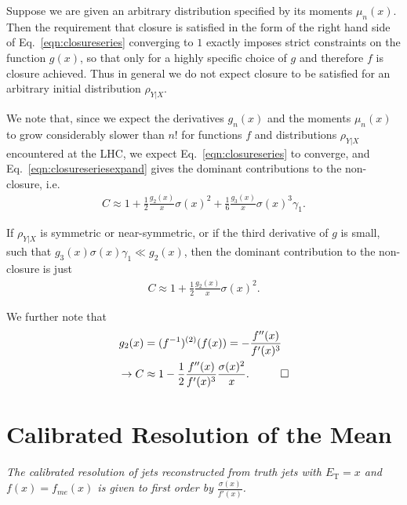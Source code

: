 Suppose we are given an arbitrary distribution specified by its moments $\mu_n(x)$. Then the requirement that closure is satisfied in the form of the right hand side of Eq.~\ref{eqn:closureseries} converging to $1$ exactly imposes strict constraints on the function $g(x)$, so that only for a highly specific choice of $g$ and therefore $f$ is closure achieved. Thus in general we do not expect closure to be satisfied for an arbitrary initial distribution $\rho_{Y|X}$.

We note that, since we expect the derivatives $g_n(x)$ and the moments $\mu_n(x)$ to grow considerably slower than $n!$ for functions $f$ and distributions $\rho_{Y|X}$ encountered at the LHC, we expect Eq.~\ref{eqn:closureseries} to converge, and Eq.~\ref{eqn:closureseriesexpand} gives the dominant contributions to the non-closure, i.e.
\begin{align}
C \approx 1+\frac{1}{2}\frac{g_2(x)}{x}\sigma(x)^2+\frac{1}{6}\frac{g_3(x)}{x}\sigma(x)^3\gamma_1.
\end{align}

If $\rho_{Y|X}$ is symmetric or near-symmetric, or if the third derivative of $g$ is small, such that $g_3(x)\sigma(x)\gamma_1 \ll g_2(x)$, then the dominant contribution to the non-closure is just
\begin{align}
C \approx 1+\frac{1}{2}\frac{g_2(x)}{x}\sigma(x)^2.
\end{align}

\noindent We further note that
\begin{align}
g_2(x) &= (f^{-1})^{(2)}(f(x)) = -\frac{f''(x)}{f'(x)^3}\nonumber\\
\rightarrow C &\approx 1-\frac{1}{2}\frac{f''(x)}{f'(x)^3}\frac{\sigma(x)^2}{x}.\hspace{1 cm}\Box
\label{eqn:closureseriesgaussian}
\end{align}

\newpage
\section{Calibrated Resolution of the Mean}
\label{sec:calibrated_resolution_calculation}
{\it The calibrated resolution of jets reconstructed from truth jets with $E_\text{T} = x$ and $f(x)=f_{me}(x)$ is given to first order by $\frac{\sigma(x)}{f'(x)}$.}

\vspace{5mm}

